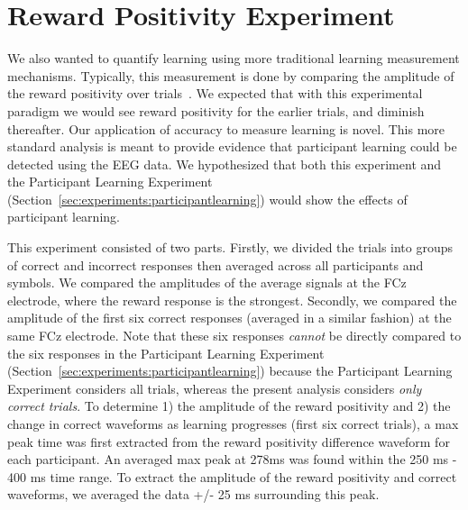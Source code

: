 \section{Reward Positivity Experiment}
\label{sec:experiments:rewpos}
We also wanted to quantify learning using more traditional learning measurement 
mechanisms. Typically, this measurement is done by comparing the amplitude of 
the reward positivity over trials~\cite{williams2017application}. We expected 
that with this experimental paradigm we would see reward positivity for the 
earlier trials, and diminish thereafter. Our application of \tvt accuracy to 
measure learning is novel.  This more standard analysis is meant to provide 
evidence that participant learning could be detected using the EEG data. We 
hypothesized that both this experiment and the Participant Learning Experiment 
(Section~\ref{sec:experiments:participantlearning}) would show the effects of 
participant learning.

This experiment consisted of two parts. Firstly, we divided the trials into 
groups of correct and incorrect responses then averaged across all participants 
and symbols. We compared the amplitudes of the average signals at the FCz 
electrode, where the reward response is the strongest. Secondly, we compared 
the amplitude of the first six correct responses (averaged in a similar 
fashion) at the same FCz electrode. Note that these six responses \emph{cannot} 
be directly compared to the six responses in the Participant Learning 
Experiment (Section~\ref{sec:experiments:participantlearning}) because the 
Participant Learning Experiment considers all trials, whereas the present 
analysis considers \emph{only correct trials}. To determine 1) the amplitude of 
the reward positivity and 2) the change in correct waveforms as learning 
progresses (first six correct trials), a max peak time was first extracted from 
the reward positivity difference waveform for each participant. An averaged max 
peak at 278ms was found within the 250 ms - 400 ms time range. To extract the 
amplitude of the reward positivity and correct waveforms, we  averaged the data 
+/- 25 ms surrounding this peak.
